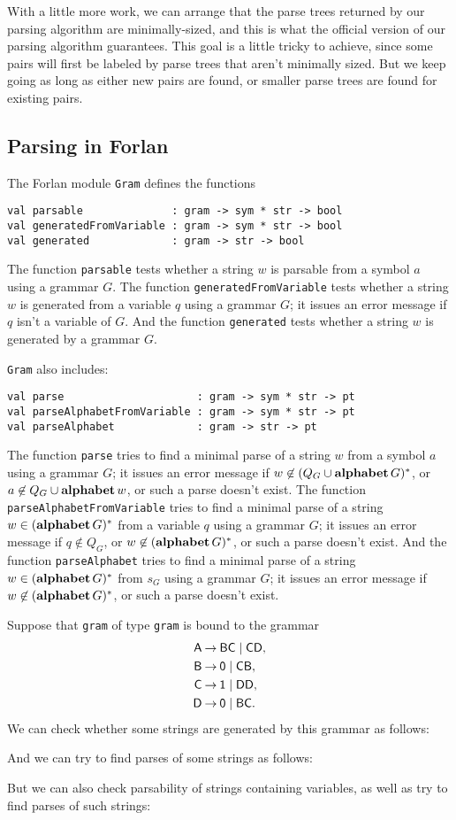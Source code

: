 With a little more work, we can arrange that the parse trees returned
by our parsing algorithm are minimally-sized, and this is what the
official version of our parsing algorithm guarantees.  This goal is a
little tricky to achieve, since some pairs will first be labeled by
parse trees that aren't minimally sized. But we keep going as long as
either new pairs are found, or smaller parse trees are found for
existing pairs.

\subsection{Parsing in Forlan}

The Forlan module \texttt{Gram} defines the functions
\begin{verbatim}
val parsable              : gram -> sym * str -> bool
val generatedFromVariable : gram -> sym * str -> bool
val generated             : gram -> str -> bool
\end{verbatim}
The function \texttt{parsable} tests whether a string $w$ is parsable
from a symbol $a$ using a grammar $G$.  The function
\texttt{generatedFromVariable} tests whether a string $w$ is generated
from a variable $q$ using a grammar $G$; it issues an error message if
$q$ isn't a variable of $G$.  And the function \texttt{generated}
tests whether a string $w$ is generated by a grammar $G$.

\texttt{Gram} also includes:
\begin{verbatim}
val parse                     : gram -> sym * str -> pt
val parseAlphabetFromVariable : gram -> sym * str -> pt
val parseAlphabet             : gram -> str -> pt
\end{verbatim}
The function \texttt{parse} tries to find a minimal parse of a string
$w$ from a symbol $a$ using a grammar $G$; it issues an error message
if $w\not\in(Q_G\cup\mathbf{alphabet}\,G)^*$, or $a\not\in
Q_G\cup\mathbf{alphabet}\,w$, or such a parse doesn't exist.  The function
\texttt{parseAlphabetFromVariable} tries to find a minimal parse of a
string $w\in(\mathbf{alphabet}\,G)^*$ from a variable $q$ using a grammar $G$;
it issues an error message if $q\not\in Q_G$, or
$w\not\in(\mathbf{alphabet}\,G)^*$, or such a parse doesn't exist.  And the
function \texttt{parseAlphabet} tries to find a minimal parse of a
string $w\in(\mathbf{alphabet}\,G)^*$ from $s_G$ using a grammar $G$; it
issues an error message if $w\not\in(\mathbf{alphabet}\,G)^*$, or such a parse
doesn't exist.

Suppose that \texttt{gram} of type \texttt{gram} is bound to the grammar
\begin{align*}
\mathsf{A} &\mathbin{\to} \mathsf{B}\mathsf{C}\mid \mathsf{C}\mathsf{D} , \\
\mathsf{B} &\mathbin{\to} \mathsf{0}\mid \mathsf{C}\mathsf{B} , \\
\mathsf{C} &\mathbin{\to} \mathsf{1}\mid \mathsf{D}\mathsf{D} , \\
\mathsf{D} &\mathbin{\to} \mathsf{0}\mid \mathsf{B}\mathsf{C} .
\end{align*}
We can check whether some strings are generated by this grammar
as follows:

And we can try to find parses of some strings as follows:

But we can also check parsability of strings containing variables, as well
as try to find parses of such strings:


